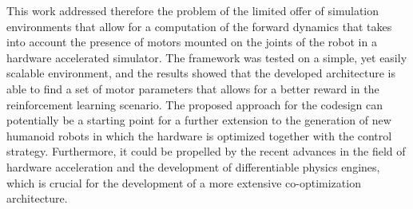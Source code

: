 This work addressed therefore the problem of the limited offer of simulation environments that allow for a computation of the forward dynamics that takes into account the presence of motors mounted on the joints of the robot in a hardware accelerated simulator. The framework was tested on a simple, yet easily scalable environment, and the results showed that the developed architecture is able to find a set of motor parameters that allows for a better reward in the reinforcement learning scenario.
The proposed approach for the codesign can potentially be a starting point for a further extension to the generation of new humanoid robots in which the hardware is optimized together with the control strategy. Furthermore, it could be propelled by the recent advances in the field of hardware acceleration and the development of differentiable physics engines, which is crucial for the development of a more extensive co-optimization architecture.
